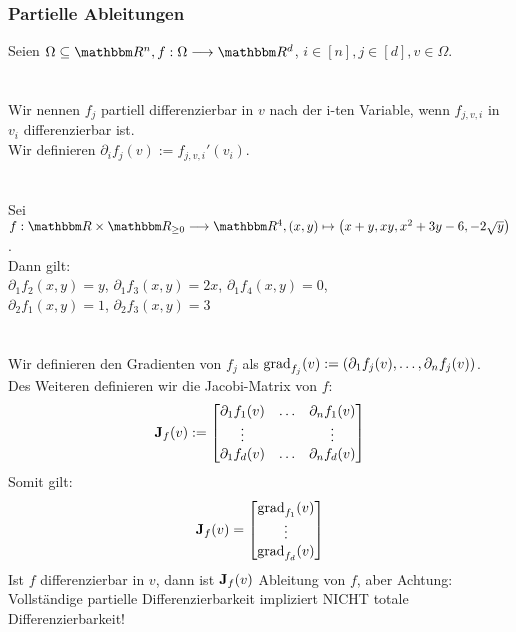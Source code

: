 \subsubsection*{Partielle Ableitungen}
Seien \(\Omega \subseteq \R^n, f : \Omega \longrightarrow \R^d\), \(i \in [n], j \in [d], v \in \Omega\). \\ \\
 \\
Wir nennen \(f_j\) partiell differenzierbar in \(v\) nach der i-ten Variable, wenn \(f_{j,v,i}\) in \(v_i\) differenzierbar ist.\\
Wir definieren \(\partial_i f_j(v) := f_{j,v,i}'(v_i)\). \\ \\
 \\
Sei \(f: \R \times \R_{\ge 0} \longrightarrow \R^4, (x,y) \mapsto \left(x+y, xy, x^2+3y-6, -2\sqrt{y}\right)\). \\
Dann gilt:\\
\(\partial_1f_2(x,y) = y\), \puffer
\(\partial_1f_3(x,y) = 2x\), \puffer
\(\partial_1f_4(x,y) = 0\), \\
\(\partial_2f_1(x,y) = 1\), \puffer
\(\partial_2f_3(x,y) = 3\) \\ \\
 \\
Wir definieren den Gradienten von \(f_j\) als \(\text{grad}_{f_j}(v) := (\partial_1f_j(v), \dots, \partial_nf_j(v))\). \\
Des Weiteren definieren wir die Jacobi-Matrix von \(f\):\[\textbf{J}_f(v) := \begin{bmatrix}
    \partial_1f_1(v) & \hdots & \partial_nf_1(v) \\
    \vdots & & \vdots \\
    \partial_1f_d(v) & \hdots & \partial_nf_d(v)
\end{bmatrix}\] Somit gilt: \[\textbf{J}_f(v) = \begin{bmatrix}
    \text{grad}_{f_1}(v) \\
    \vdots \\
    \text{grad}_{f_d}(v)
\end{bmatrix}\]
Ist \(f\) differenzierbar in \(v\), dann ist \(\textbf{J}_f(v)\) Ableitung von \(f\), aber Achtung: Vollständige partielle Differenzierbarkeit impliziert NICHT totale Differenzierbarkeit! \\ \\
 \\
